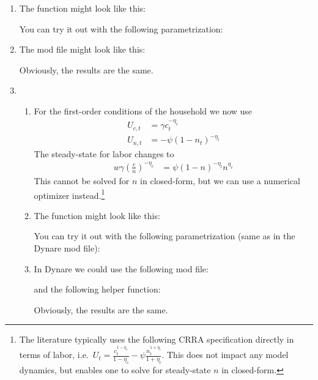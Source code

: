 \begin{enumerate}
\item
The function might look like this:

You can try it out with the following parametrization:


\item
The mod file might look like this:

Obviously, the results are the same.

\item
\begin{enumerate}
\item
 For the first-order conditions of the household we now use
\begin{align*}
U_{c,t} &= \gamma c_t^{-\eta_c}
\\
U_{n,t} &= - \psi {(1-n_t)}^{-\eta_l}
\end{align*}
The steady-state for labor changes to
\begin{align*}
w \gamma {\left(\frac{c}{n}\right)}^{-\eta_c} &= \psi {(1-n)}^{-\eta_l} n^{\eta_c}
\end{align*}
This cannot be solved for \(n\) in closed-form, but we can use a numerical optimizer instead.\footnote{%
  The literature typically uses the following CRRA specification directly in terms of labor, i.e.\
  \(U_t = \frac{c_{t}^{1-\eta_c}}{1-\eta_c} - \psi \frac{n_{t}^{1+\eta_l}}{1+\eta_l}\).
  This does not impact any model dynamics, but enables one to solve for steady-state \(n\) in closed-form.}

\item
The function might look like this:

You can try it out with the following parametrization (same as in the Dynare mod file):


\item
In Dynare we could use the following mod file:

and the following helper function:

Obviously, the results are the same.

\end{enumerate}

\end{enumerate}